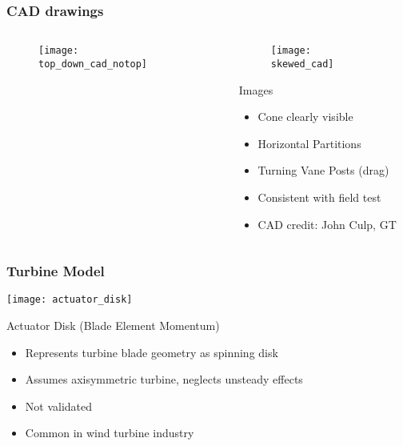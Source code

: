 \documentclass[mathserif]{beamer}
\begin{document}
%
%
%
\begin{frame}
 \frametitle{CAD drawings}

 \begin{columns}[]
  \begin{column}{0.55\linewidth}

    \begin{figure}[htb]
     \centering
     \texttt{[image: top\_down\_cad\_notop]}
    \end{figure}

  \end{column}
   \begin{column}{0.45\linewidth}

    \begin{figure}[htb]
     \centering
     \texttt{[image: skewed\_cad]}
    \end{figure}

    \begin{block}{Images}
     \begin{itemize}
      \item Cone clearly visible
      \item Horizontal Partitions
      \item Turning Vane Posts (drag)
      \item Consistent with field test 
      \item CAD credit: John Culp, GT
     \end{itemize}
     \end{block}

   \end{column}
 \end{columns}

\end{frame}

%
%
%
\begin{frame}
 \frametitle{Turbine Model}

 \begin{center}
  \texttt{[image: actuator\_disk]}
 \end{center}
 
 \begin{block}{Actuator Disk (Blade Element Momentum)}
  \begin{itemize}
  \item Represents turbine blade geometry as spinning disk
  \item Assumes axisymmetric turbine, neglects unsteady effects
  \item Not validated
  \item Common in wind turbine industry
  \end{itemize}
 \end{block}

\end{frame}
\end{document}
